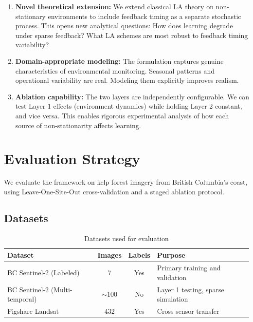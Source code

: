 \documentclass[11pt,a4paper]{article}
\begin{document}
\begin{enumerate}
    \item \textbf{Novel theoretical extension:} We extend classical LA theory on non-stationary environments to include feedback timing as a separate stochastic process. This opens new analytical questions: How does learning degrade under sparse feedback? What LA schemes are most robust to feedback timing variability?

    \item \textbf{Domain-appropriate modeling:} The formulation captures genuine characteristics of environmental monitoring. Seasonal patterns and operational variability are real. Modeling them explicitly improves realism.

    \item \textbf{Ablation capability:} The two layers are independently configurable. We can test Layer 1 effects (environment dynamics) while holding Layer 2 constant, and vice versa. This enables rigorous experimental analysis of how each source of non-stationarity affects learning.
\end{enumerate}


\section{Evaluation Strategy}
\label{sec:evaluation}

We evaluate the framework on kelp forest imagery from British Columbia's coast, using Leave-One-Site-Out cross-validation and a staged ablation protocol.

\subsection{Datasets}

\begin{table}[h]
\centering
\caption{Datasets used for evaluation}
\label{tab:datasets}
\begin{tabular}{lccp{5cm}}
\toprule
\textbf{Dataset} & \textbf{Images} & \textbf{Labels} & \textbf{Purpose} \\
\midrule
BC Sentinel-2 (Labeled) & 7 & Yes & Primary training and validation \\
BC Sentinel-2 (Multi-temporal) & $\sim$100 & No & Layer 1 testing, sparse simulation \\
Figshare Landsat & 432 & Yes & Cross-sensor transfer \\
\bottomrule
\end{tabular}
\end{table}
\end{document}
